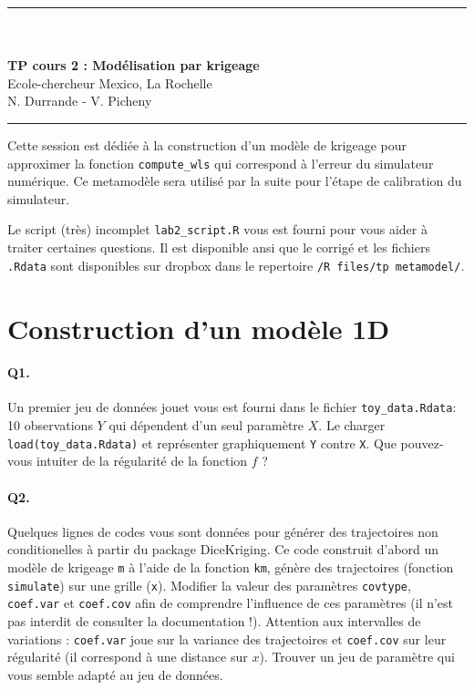 \documentclass[12pt]{scrartcl}
\begin{document}
\begin{center}
	\rule{\textwidth}{1pt}
	\\ \ \\
	{\LARGE \textbf{TP cours 2 : Modélisation par krigeage}}\\
	\vspace{3mm}
	{\large Ecole-chercheur Mexico, La Rochelle \\ \vspace{3mm}}
	{\normalsize N. Durrande - V. Picheny}\\
	\vspace{3mm}
	\rule{\textwidth}{1pt}
	\vspace{5mm}
\end{center}
Cette session est dédiée à la construction d'un modèle de krigeage pour approximer la fonction  \texttt{compute\_wls} qui correspond à l'erreur du simulateur numérique. 
Ce metamodèle sera utilisé par la suite pour l'étape de calibration du simulateur.

Le script (très) incomplet \texttt{lab2\_script.R} vous est fourni pour vous aider à traiter certaines questions. Il est disponible ansi que le corrigé et les fichiers \texttt{.Rdata} sont disponibles sur dropbox 
dans le repertoire \texttt{/R files/tp metamodel/}.

\section{Construction d'un modèle 1D}

\paragraph{Q1.} Un premier jeu de données jouet vous est fourni dans le fichier \texttt{toy\_data.Rdata}: 10 observations $Y$ qui dépendent d'un seul paramètre $X$. 
Le charger \texttt{load(toy\_data.Rdata)} et représenter graphiquement \texttt{Y} contre \texttt{X}. Que pouvez-vous intuiter de la régularité de la fonction $f$ ?

\paragraph{Q2.} Quelques lignes de codes vous sont données pour générer des trajectoires non conditionelles à partir du package DiceKriging. Ce code construit d'abord un modèle de krigeage \texttt{m} à l'aide de la fonction \texttt{km},
génère des trajectoires (fonction \texttt{simulate}) sur une grille (\texttt{x}). Modifier la valeur des paramètres \texttt{covtype}, \texttt{coef.var} et \texttt{coef.cov} 
afin de comprendre l'influence de ces paramètres (il n'est pas interdit de consulter la documentation !). Attention aux intervalles de variations : \texttt{coef.var} joue sur la variance des trajectoires
et \texttt{coef.cov} sur leur régularité (il correspond à une distance sur $x$). Trouver un jeu de paramètre qui vous semble adapté au jeu de données.
\end{document}
